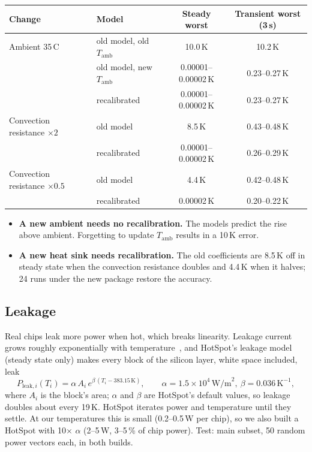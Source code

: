 \documentclass[11pt,a4paper]{article}
\newcommand{\degC}{\,\textdegree C}
\begin{document}
\begin{center}
\small
\begin{tabular}{@{}l l c c@{}}
\toprule
Change & Model & Steady worst & Transient worst (3\,s) \\
\midrule
Ambient 35\degC & old model, old $T_\text{amb}$ & 10.0\,K & 10.2\,K \\
 & old model, new $T_\text{amb}$ & 0.00001--0.00002\,K & 0.23--0.27\,K \\
 & recalibrated & 0.00001--0.00002\,K & 0.23--0.27\,K \\
\midrule
Convection resistance $\times 2$ & old model & 8.5\,K & 0.43--0.48\,K \\
 & recalibrated & 0.00001--0.00002\,K & 0.26--0.29\,K \\
\midrule
Convection resistance $\times 0.5$ & old model & 4.4\,K & 0.42--0.48\,K \\
 & recalibrated & 0.00002\,K & 0.20--0.22\,K \\
\bottomrule
\end{tabular}
\end{center}
\begin{itemize}
  \item \textbf{A new ambient needs no recalibration.} The models predict the rise above ambient.
        Forgetting to update $T_\text{amb}$ results in a 10\,K error.
  \item \textbf{A new heat sink needs recalibration.} The old coefficients are 8.5\,K off in steady
        state when the convection resistance doubles and 4.4\,K when it halves; 24 runs under the
        new package restore the accuracy.
\end{itemize}

\subsection{Leakage}
Real chips leak more power when hot, which breaks linearity. Leakage current grows roughly
exponentially with temperature~\cite{liao05}, and HotSpot's leakage model~\cite{hotspot6} (steady
state only) makes every block of the silicon layer, white space included, leak
\begin{equation}
  P_{\text{leak},i}(T_i) = \alpha\, A_i\, e^{\beta\,(T_i - 383.15\,\text{K})},
  \qquad \alpha = 1.5\times10^{4}\,\text{W/m}^2,\ \beta = 0.036\,\text{K}^{-1},
  \label{eq:leak}
\end{equation}
where $A_i$ is the block's area; $\alpha$ and $\beta$ are HotSpot's default values, so leakage
doubles about every 19\,K. HotSpot iterates power and temperature until they settle. At our
temperatures this is small (0.2--0.5\,W per chip), so we also built a HotSpot with 10$\times$
$\alpha$ (2--5\,W, 3--5\,\% of chip power). Test: main subset, 50 random power vectors each, in
both builds.
\end{document}
